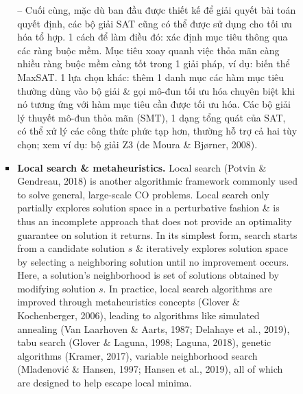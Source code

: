 \documentclass{article}
\begin{document}
\begin{itemize}
\begin{itemize}
\begin{itemize}
\begin{itemize}
                -- Cuối cùng, mặc dù ban đầu được thiết kế để giải quyết bài toán quyết định, các bộ giải SAT cũng có thể được sử dụng cho tối ưu hóa tổ hợp. 1 cách để làm điều đó: xác định mục tiêu thông qua các ràng buộc mềm. Mục tiêu xoay quanh việc thỏa mãn càng nhiều ràng buộc mềm càng tốt trong 1 giải pháp, ví dụ: biến thể MaxSAT. 1 lựa chọn khác: thêm 1 danh mục các hàm mục tiêu thường dùng vào bộ giải \& gọi mô-đun tối ưu hóa chuyên biệt khi nó tương ứng với hàm mục tiêu cần được tối ưu hóa. Các bộ giải lý thuyết mô-đun thỏa mãn (SMT), 1 dạng tổng quát của SAT, có thể xử lý các công thức phức tạp hơn, thường hỗ trợ cả hai tùy chọn; xem ví dụ: bộ giải Z3 (de Moura \& Bjørner, 2008).
                \item {\bf Local search \& metaheuristics.} Local search (Potvin \& Gendreau, 2018) is another algorithmic framework commonly used to solve general, large-scale CO problems. Local search only partially explores solution space in a perturbative fashion \& is thus an incomplete approach that does not provide an optimality guarantee on solution it returns. In its simplest form, search starts from a candidate solution $s$ \& iteratively explores solution space by selecting a neighboring solution until no improvement occurs. Here, a solution's neighborhood is set of solutions obtained by modifying solution $s$. In practice, local search algorithms are improved through metaheuristics concepts (Glover \& Kochenberger, 2006), leading to algorithms like simulated annealing (Van Laarhoven \& Aarts, 1987; Delahaye et al., 2019), tabu search (Glover \& Laguna, 1998; Laguna, 2018), genetic algorithms (Kramer, 2017), variable neighborhood search (Mladenović \& Hansen, 1997; Hansen et al., 2019), all of which are designed to help escape local minima.


\end{itemize}
\end{itemize}
\end{itemize}
\end{itemize}
\end{document}
